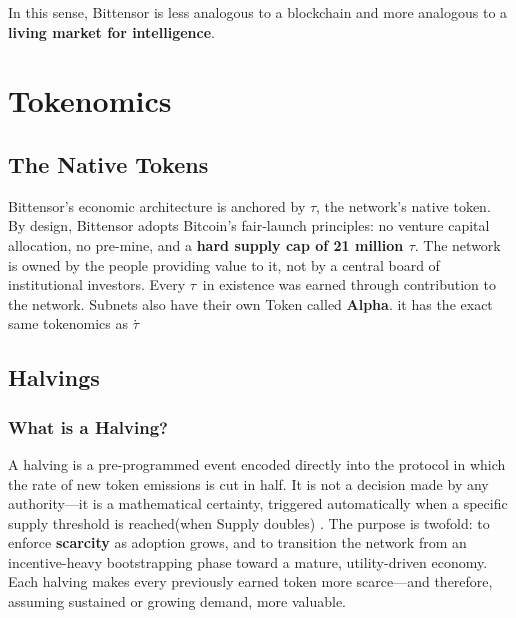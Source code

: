 \documentclass[12pt, a4paper, oneside]{report}
\newcommand{\TAO}{$\tau$}            %
\theoremstyle{definition}
\begin{document}
In this sense, Bittensor is less analogous to a blockchain and more analogous to a 
\textbf{living market for intelligence}.






\section{Tokenomics}
\label{sec:tokenomics}

\subsection{The Native Tokens}

Bittensor's economic architecture is anchored by \textbf{\TAO}, the network's native 
token. By design, Bittensor adopts Bitcoin's fair-launch principles: no venture capital 
allocation, no pre-mine, and a \textbf{hard supply cap of 21 million \TAO}. The network is owned by the people 
providing value to it, not by a central board of institutional 
investors. Every \TAO\ in existence was earned through contribution to the network. Subnets also have their own Token called \textbf{Alpha}. it has the exact same tokenomics as \TAO\.

\subsection{Halvings}



\subsubsection*{What is a Halving?}

A halving is a pre-programmed event encoded directly into the protocol in which the 
rate of new token emissions is cut in half. It is not a decision made by any 
authority—it is a mathematical certainty, triggered automatically when a specific 
supply threshold is reached(when Supply doubles) . The purpose is twofold: to enforce \textbf{scarcity} 
as adoption grows, and to transition the network from an incentive-heavy bootstrapping 
phase toward a mature, utility-driven economy. Each halving makes every previously 
earned token more scarce—and therefore, assuming sustained or growing demand, 
more valuable.
\end{document}
